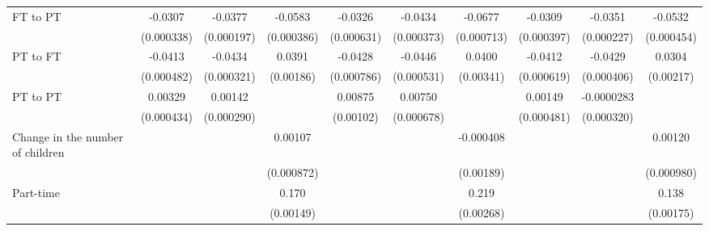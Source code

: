 {\begin{tabular}{l*{9}{c}}
\addlinespace
FT to PT            &     -0.0307\sym{***}&     -0.0377\sym{***}&     -0.0583\sym{***}&     -0.0326\sym{***}&     -0.0434\sym{***}&     -0.0677\sym{***}&     -0.0309\sym{***}&     -0.0351\sym{***}&     -0.0532\sym{***}\\
                    &  (0.000338)         &  (0.000197)         &  (0.000386)         &  (0.000631)         &  (0.000373)         &  (0.000713)         &  (0.000397)         &  (0.000227)         &  (0.000454)         \\
\addlinespace
PT to FT            &     -0.0413\sym{***}&     -0.0434\sym{***}&      0.0391\sym{***}&     -0.0428\sym{***}&     -0.0446\sym{***}&      0.0400\sym{***}&     -0.0412\sym{***}&     -0.0429\sym{***}&      0.0304\sym{***}\\
                    &  (0.000482)         &  (0.000321)         &   (0.00186)         &  (0.000786)         &  (0.000531)         &   (0.00341)         &  (0.000619)         &  (0.000406)         &   (0.00217)         \\
\addlinespace
PT to PT            &     0.00329\sym{***}&     0.00142\sym{***}&                     &     0.00875\sym{***}&     0.00750\sym{***}&                     &     0.00149\sym{***}&  -0.0000283         &                     \\
                    &  (0.000434)         &  (0.000290)         &                     &   (0.00102)         &  (0.000678)         &                     &  (0.000481)         &  (0.000320)         &                     \\
\addlinespace
Change in the number of children&                     &                     &     0.00107         &                     &                     &   -0.000408         &                     &                     &     0.00120         \\
                    &                     &                     &  (0.000872)         &                     &                     &   (0.00189)         &                     &                     &  (0.000980)         \\
\addlinespace
Part-time           &                     &                     &       0.170\sym{***}&                     &                     &       0.219\sym{***}&                     &                     &       0.138\sym{***}\\
                    &                     &                     &   (0.00149)         &                     &                     &   (0.00268)         &                     &                     &   (0.00175)         \\

\end{tabular}}
